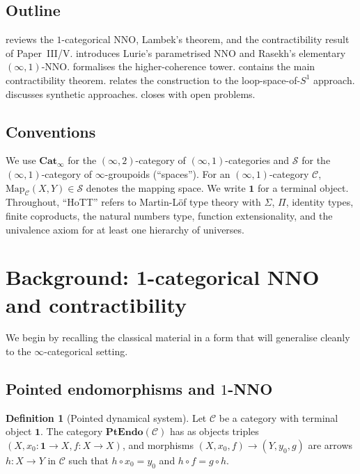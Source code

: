 \documentclass[12pt]{article}
\theoremstyle{definition}
\newtheorem{definition}[theorem]{Definition}
\theoremstyle{remark}
\newcommand{\Map}{\mathrm{Map}}
\newcommand{\PtEndo}{\mathbf{PtEndo}}
\newcommand{\Sone}{S^{1}}
\newcommand{\Cati}{\mathbf{Cat}_{\infty}}
\newcommand{\Spc}{\mathcal{S}}
\newcommand{\Sigmatype}{\Sigma}
\newcommand{\Pitype}{\Pi}
\begin{document}
\subsection*{Outline}

 reviews the $1$-categorical NNO, Lambek's theorem, and the contractibility result of Paper~III/V\@.  introduces Lurie's parametrised NNO and Rasekh's elementary $(\infty,1)$-NNO\@.  formalises the higher-coherence tower.  contains the main contractibility theorem.  relates the construction to the loop-space-of-$\Sone$ approach.  discusses synthetic approaches.  closes with open problems.

\subsection*{Conventions}

We use $\Cati$ for the $(\infty,2)$-category of $(\infty,1)$-categories and $\Spc$ for the $(\infty,1)$-category of $\infty$-groupoids (``spaces''). For an $(\infty,1)$-category $\mathcal{C}$, $\Map_{\mathcal{C}}(X,Y)\in\Spc$ denotes the mapping space. We write $\mathbf{1}$ for a terminal object. Throughout, ``HoTT'' refers to Martin-L\"of type theory with $\Sigmatype$, $\Pitype$, identity types, finite coproducts, the natural numbers type, function extensionality, and the univalence axiom for at least one hierarchy of universes.

\section{Background: 1-categorical NNO and contractibility}\label{sec:background}

We begin by recalling the classical material in a form that will generalise cleanly to the $\infty$-categorical setting.

\subsection{Pointed endomorphisms and \texorpdfstring{$1$}{1}-NNO}

\begin{definition}[Pointed dynamical system]\label{def:ptendo}
Let $\mathcal{C}$ be a category with terminal object $\mathbf{1}$. The category $\PtEndo(\mathcal{C})$ has as objects triples $(X, x_{0}\colon \mathbf{1}\to X, f\colon X\to X)$, and morphisms $(X,x_{0},f)\to(Y,y_{0},g)$ are arrows $h\colon X\to Y$ in $\mathcal{C}$ such that $h\circ x_{0}=y_{0}$ and $h\circ f = g\circ h$.
\end{definition}
\end{document}
